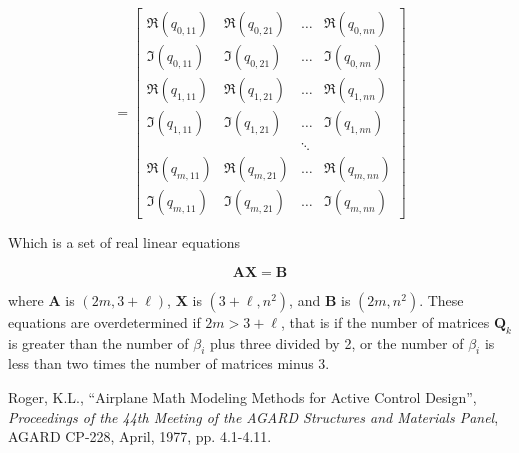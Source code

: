 \documentclass[11pt]{article}
\newcommand{\Matrix}[1]{\boldsymbol{#1}}
\begin{document}
\begin{equation}
 =
\left[
\begin{array}{cccc}
\Re(q_{0,11})   & \Re(q_{0,21})   & \ldots & \Re(q_{0,nn}) \\
\Im(q_{0,11})   & \Im(q_{0,21})   & \ldots & \Im(q_{0,nn}) \\
\Re(q_{1,11})   & \Re(q_{1,21})   & \ldots & \Re(q_{1,nn}) \\
\Im(q_{1,11})   & \Im(q_{1,21})   & \ldots & \Im(q_{1,nn}) \\
                &                 & \ddots &          \\
\Re(q_{m,11}) & \Re(q_{m,21}) & \ldots & \Re(q_{m,nn}) \\
\Im(q_{m,11}) & \Im(q_{m,21}) & \ldots & \Im(q_{m,nn})
\end{array}
\right]
\end{equation}

Which is a set of real linear equations

\begin{equation}
\Matrix{AX} = \Matrix{B}
\end{equation}

where $\Matrix{A}$ is $(2m, 3+\ell)$, $\Matrix{X}$ is $(3+\ell, n^2)$,
and $\Matrix{B}$ is $(2m, n^2)$. These equations are overdetermined
if $2m > 3+\ell$, that is if the number of matrices $\Matrix{Q}_k$
is greater than the number of $\beta_i$ plus three divided by 2,
or the number of $\beta_i$ is less than two times the number of matrices
minus 3.

\begin{thebibliography}{}
 Roger, K.L., ``Airplane Math Modeling Methods for Active Control Design'', \textit{Proceedings of the 44th Meeting of the AGARD Structures and Materials Panel}, AGARD CP-228, April, 1977, pp. 4.1-4.11.
\end{thebibliography}
\end{document}
